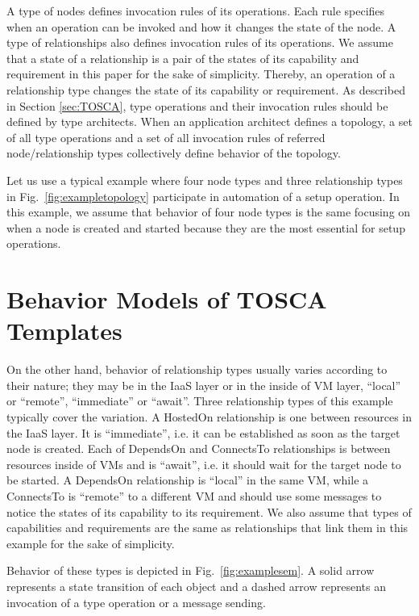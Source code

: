 \documentclass[12pt]{report}
\begin{document}
A type of nodes defines invocation rules of its operations. Each rule
specifies when an operation can be invoked and how it changes the
state of the node.
A type of relationships also defines invocation rules of its
operations. We assume that a state of a relationship is a pair of the
states of its capability and requirement in this paper for the sake of
simplicity. Thereby, an operation of a relationship type changes the
state of its capability or requirement.
As described in Section \ref{sec:TOSCA}, type operations and their
invocation rules should be defined by type architects. When an
application architect defines a topology, a set of all type operations
and a set of all invocation rules of referred node/relationship types
collectively define behavior of the topology.

Let us use a typical example where four node types and three
relationship types in Fig.~\ref{fig:exampletopology} participate in
automation of a setup operation. In this example, we assume that
behavior of four node types is the same focusing on when a node is
created and started because they are the most essential for setup
operations.

\section{Behavior Models of TOSCA Templates}
\label{sec:TOSCAbehavior}
On the other hand, behavior of relationship types usually varies
according to their nature; they may be in the IaaS layer or in the
inside of VM layer, ``local'' or ``remote'', ``immediate'' or
``await''. Three relationship types of this example typically cover
the variation. A HostedOn relationship is one between resources in the
IaaS layer.  It is ``immediate'', i.e. it can be established as soon
as the target node is created.  Each of DependsOn and ConnectsTo
relationships is between resources inside of VMs and is ``await'',
i.e. it should wait for the target node to be started. A DependsOn
relationship is ``local'' in the same VM, while a ConnectsTo is
``remote'' to a different VM and should use some messages to notice
the states of its capability to its requirement.  We also assume that
types of capabilities and requirements are the same as relationships
that link them in this example for the sake of simplicity.

Behavior of these types is depicted in Fig.~\ref{fig:examplesem}.  A
solid arrow represents a state transition of each object and a dashed
arrow represents an invocation of a type operation or a message
sending.
\end{document}
